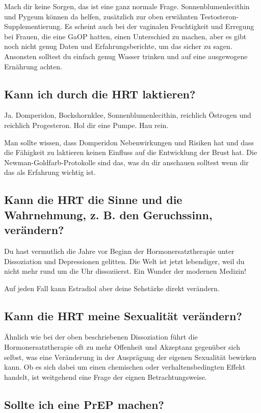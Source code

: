 \documentclass{article}
\begin{document}
Mach dir keine Sorgen, das ist eine ganz normale Frage. Sonnenblumenlecithin und Pygeum können da helfen, zusätzlich zur oben erwähnten Testosteron-Supplementierung. Es scheint auch bei der vaginalen Feuchtigkeit und Erregung bei Frauen, die eine GaOP hatten, einen Unterschied zu machen, aber es gibt noch nicht genug Daten und Erfahrungsberichte, um das sicher zu sagen. Ansonsten solltest du einfach genug Wasser trinken und auf eine ausgewogene Ernährung achten.

\subsection{Kann ich durch die HRT laktieren?}

Ja. Domperidon, Bockshornklee, Sonnenblumenlecithin, reichlich Östrogen und reichlich Progesteron. Hol dir eine Pumpe. Hau rein.

Man sollte wissen, dass Domperidon Nebenwirkungen und Risiken hat und dass die Fähigkeit zu laktieren keinen Einfluss auf die Entwicklung der Brust hat. Die Newman-Goldfarb-Protokolle sind das, was du dir anschauen solltest wenn dir das als Erfahrung wichtig ist.

\subsection{Kann die HRT die Sinne und die Wahrnehmung, z. B. den Geruchssinn, verändern?}

Du hast vermutlich die Jahre vor Beginn der Hormonersatztherapie unter Dissoziation und Depressionen gelitten. Die Welt ist jetzt lebendiger, weil du nicht mehr rund um die Uhr dissoziierst. Ein Wunder der modernen Medizin!

Auf jeden Fall kann Estradiol aber deine Sehstärke direkt verändern.

\subsection{Kann die HRT meine Sexualität verändern?}

Ähnlich wie bei der oben beschriebenen Dissoziation führt die Hormonersatztherapie oft zu mehr Offenheit und Akzeptanz gegenüber sich selbst, was eine Veränderung in der Ausprägung der eigenen Sexualität bewirken kann. Ob es sich dabei um einen chemischen oder verhaltensbedingten Effekt handelt, ist weitgehend eine Frage der eignen Betrachtungsweise.

\subsection{Sollte ich eine PrEP machen?}\label{11-25}
\end{document}
